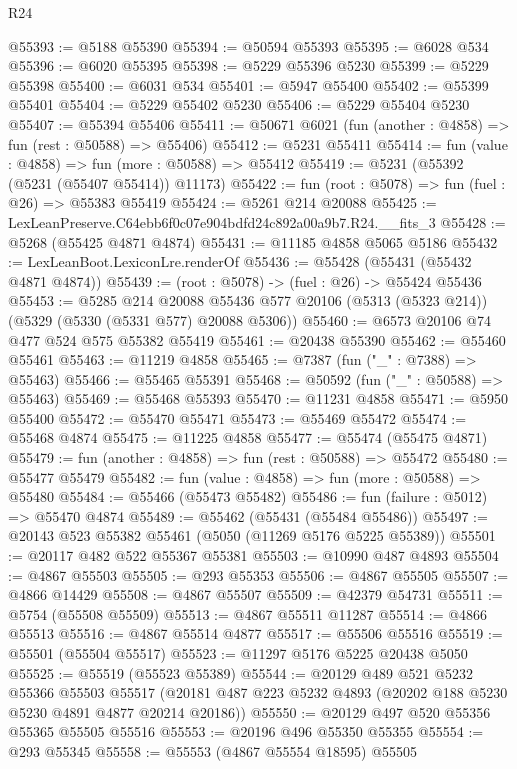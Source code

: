 \begin{lexlean}{R24}
\begin{coremodule}
@55393 := @5188 @55390
@55394 := @50594 @55393
@55395 := @6028 @534
@55396 := @6020 @55395
@55398 := @5229 @55396 @5230
@55399 := @5229 @55398
@55400 := @6031 @534
@55401 := @5947 @55400
@55402 := @55399 @55401
@55404 := @5229 @55402 @5230
@55406 := @5229 @55404 @5230
@55407 := @55394 @55406
@55411 := @50671 @6021 (fun (another : @4858) => fun (rest : @50588) => @55406)
@55412 := @5231 @55411
@55414 := fun (value : @4858) => fun (more : @50588) => @55412
@55419 := @5231 (@55392 (@5231 (@55407 @55414)) @11173)
@55422 := fun (root : @5078) => fun (fuel : @26) => @55383 @55419
@55424 := @5261 @214 @20088
@55425 := LexLeanPreserve.C64ebb6f0c07e904bdfd24c892a00a9b7.R24.__fits_3
@55428 := @5268 (@55425 @4871 @4874)
@55431 := @11185 @4858 @5065 @5186
@55432 := LexLeanBoot.LexiconLre.renderOf
@55436 := @55428 (@55431 (@55432 @4871 @4874))
@55439 := (root : @5078) -> (fuel : @26) -> @55424 @55436
@55453 := @5285
    @214
    @20088
    @55436
    @577
    @20106
    (@5313 (@5323 @214))
    (@5329 (@5330 (@5331 @577) @20088 @5306))
@55460 := @6573 @20106 @74 @477 @524 @575 @55382 @55419
@55461 := @20438 @55390
@55462 := @55460 @55461
@55463 := @11219 @4858
@55465 := @7387 (fun ("_" : @7388) => @55463)
@55466 := @55465 @55391
@55468 := @50592 (fun ("_" : @50588) => @55463)
@55469 := @55468 @55393
@55470 := @11231 @4858
@55471 := @5950 @55400
@55472 := @55470 @55471
@55473 := @55469 @55472
@55474 := @55468 @4874
@55475 := @11225 @4858
@55477 := @55474 (@55475 @4871)
@55479 := fun (another : @4858) => fun (rest : @50588) => @55472
@55480 := @55477 @55479
@55482 := fun (value : @4858) => fun (more : @50588) => @55480
@55484 := @55466 (@55473 @55482)
@55486 := fun (failure : @5012) => @55470 @4874
@55489 := @55462 (@55431 (@55484 @55486))
@55497 := @20143 @523 @55382 @55461 (@5050 (@11269 @5176 @5225 @55389))
@55501 := @20117 @482 @522 @55367 @55381
@55503 := @10990 @487 @4893
@55504 := @4867 @55503
@55505 := @293 @55353
@55506 := @4867 @55505
@55507 := @4866 @14429
@55508 := @4867 @55507
@55509 := @42379 @54731
@55511 := @5754 (@55508 @55509)
@55513 := @4867 @55511 @11287
@55514 := @4866 @55513
@55516 := @4867 @55514 @4877
@55517 := @55506 @55516
@55519 := @55501 (@55504 @55517)
@55523 := @11297 @5176 @5225 @20438 @5050
@55525 := @55519 (@55523 @55389)
@55544 := @20129
    @489
    @521
    @5232
    @55366
    @55503
    @55517
    (@20181 @487 @223 @5232 @4893 (@20202 @188 @5230 @5230 @4891 @4877 @20214 @20186))
@55550 := @20129 @497 @520 @55356 @55365 @55505 @55516
@55553 := @20196 @496 @55350 @55355
@55554 := @293 @55345
@55558 := @55553 (@4867 @55554 @18595) @55505

\end{coremodule}
\end{lexlean}
